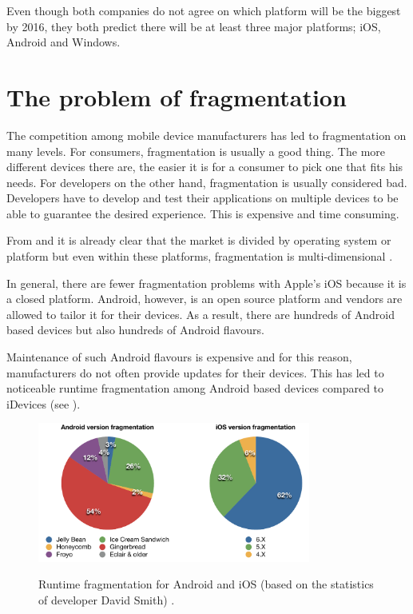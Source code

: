 \npar Even though both companies do not agree on which platform will be the biggest by 2016, they both predict there will be at least three major platforms; iOS, Android and Windows. 


\section{The problem of fragmentation}

\npar The competition among mobile device manufacturers has led to fragmentation on many levels. For consumers, fragmentation is usually a good thing. The more different devices there are, the easier it is for a consumer to pick one that fits his needs. For developers on the other hand, fragmentation is usually considered bad. Developers have to develop and test their applications on multiple devices to be able to guarantee the desired experience. This is expensive and time consuming.

\npar From  and  it is already clear that the market is divided by operating system or platform but even within these platforms, fragmentation is multi-dimensional \citep{Kindel}.

\npar In general, there are fewer fragmentation problems with Apple's iOS because it is a closed platform. Android, however, is an open source platform and vendors are allowed to tailor it for their devices. As a result, there are hundreds of Android based devices but also hundreds of Android flavours.

\npar Maintenance of such Android flavours is expensive and for this reason, manufacturers do not often provide updates for their devices. This has led to noticeable runtime fragmentation among Android based devices compared to iDevices (see ). 

\begin{figure}
    \begin{center}
        \label{fig:runtime_fragmentation}
        \includegraphics[width=0.8\textwidth]{figs/os_distribution.pdf}
        \caption{
            Runtime fragmentation for Android \citep{android_distribution} and iOS (based on the statistics of developer David Smith) \citep{ios_distribution}.
        }
    \end{center}
\end{figure}

